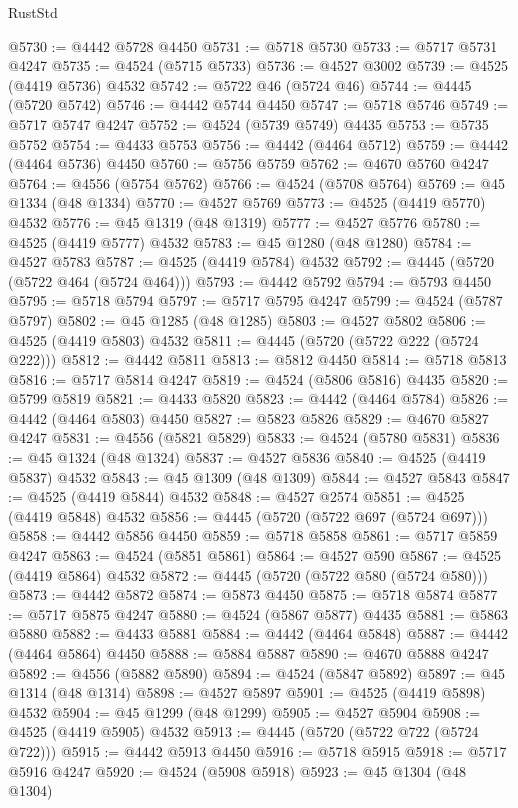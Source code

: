 \begin{lexlean}{RustStd}
\begin{coremodule}
@5730 := @4442 @5728 @4450
@5731 := @5718 @5730
@5733 := @5717 @5731 @4247
@5735 := @4524 (@5715 @5733)
@5736 := @4527 @3002
@5739 := @4525 (@4419 @5736) @4532
@5742 := @5722 @46 (@5724 @46)
@5744 := @4445 (@5720 @5742)
@5746 := @4442 @5744 @4450
@5747 := @5718 @5746
@5749 := @5717 @5747 @4247
@5752 := @4524 (@5739 @5749) @4435
@5753 := @5735 @5752
@5754 := @4433 @5753
@5756 := @4442 (@4464 @5712)
@5759 := @4442 (@4464 @5736) @4450
@5760 := @5756 @5759
@5762 := @4670 @5760 @4247
@5764 := @4556 (@5754 @5762)
@5766 := @4524 (@5708 @5764)
@5769 := @45 @1334 (@48 @1334)
@5770 := @4527 @5769
@5773 := @4525 (@4419 @5770) @4532
@5776 := @45 @1319 (@48 @1319)
@5777 := @4527 @5776
@5780 := @4525 (@4419 @5777) @4532
@5783 := @45 @1280 (@48 @1280)
@5784 := @4527 @5783
@5787 := @4525 (@4419 @5784) @4532
@5792 := @4445 (@5720 (@5722 @464 (@5724 @464)))
@5793 := @4442 @5792
@5794 := @5793 @4450
@5795 := @5718 @5794
@5797 := @5717 @5795 @4247
@5799 := @4524 (@5787 @5797)
@5802 := @45 @1285 (@48 @1285)
@5803 := @4527 @5802
@5806 := @4525 (@4419 @5803) @4532
@5811 := @4445 (@5720 (@5722 @222 (@5724 @222)))
@5812 := @4442 @5811
@5813 := @5812 @4450
@5814 := @5718 @5813
@5816 := @5717 @5814 @4247
@5819 := @4524 (@5806 @5816) @4435
@5820 := @5799 @5819
@5821 := @4433 @5820
@5823 := @4442 (@4464 @5784)
@5826 := @4442 (@4464 @5803) @4450
@5827 := @5823 @5826
@5829 := @4670 @5827 @4247
@5831 := @4556 (@5821 @5829)
@5833 := @4524 (@5780 @5831)
@5836 := @45 @1324 (@48 @1324)
@5837 := @4527 @5836
@5840 := @4525 (@4419 @5837) @4532
@5843 := @45 @1309 (@48 @1309)
@5844 := @4527 @5843
@5847 := @4525 (@4419 @5844) @4532
@5848 := @4527 @2574
@5851 := @4525 (@4419 @5848) @4532
@5856 := @4445 (@5720 (@5722 @697 (@5724 @697)))
@5858 := @4442 @5856 @4450
@5859 := @5718 @5858
@5861 := @5717 @5859 @4247
@5863 := @4524 (@5851 @5861)
@5864 := @4527 @590
@5867 := @4525 (@4419 @5864) @4532
@5872 := @4445 (@5720 (@5722 @580 (@5724 @580)))
@5873 := @4442 @5872
@5874 := @5873 @4450
@5875 := @5718 @5874
@5877 := @5717 @5875 @4247
@5880 := @4524 (@5867 @5877) @4435
@5881 := @5863 @5880
@5882 := @4433 @5881
@5884 := @4442 (@4464 @5848)
@5887 := @4442 (@4464 @5864) @4450
@5888 := @5884 @5887
@5890 := @4670 @5888 @4247
@5892 := @4556 (@5882 @5890)
@5894 := @4524 (@5847 @5892)
@5897 := @45 @1314 (@48 @1314)
@5898 := @4527 @5897
@5901 := @4525 (@4419 @5898) @4532
@5904 := @45 @1299 (@48 @1299)
@5905 := @4527 @5904
@5908 := @4525 (@4419 @5905) @4532
@5913 := @4445 (@5720 (@5722 @722 (@5724 @722)))
@5915 := @4442 @5913 @4450
@5916 := @5718 @5915
@5918 := @5717 @5916 @4247
@5920 := @4524 (@5908 @5918)
@5923 := @45 @1304 (@48 @1304)

\end{coremodule}
\end{lexlean}
